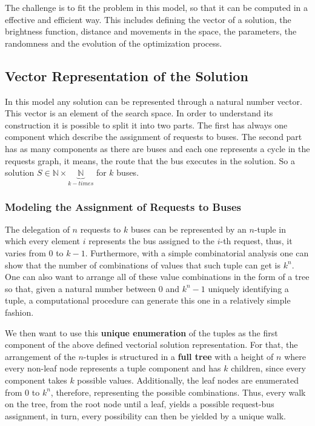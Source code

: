 \documentclass[tuberlin,cic,tc,openright,english,noabntcite,oneside]{iiufrgs}
\begin{document}
The challenge is to fit the problem in this model, so that it can be computed in a effective and efficient way. This includes defining the vector of a solution, the brightness function, distance and movements in the space, the parameters, the randomness and the evolution of the optimization process.

\subsection{Vector Representation of the Solution}
In this model any solution can be represented through a natural number vector. This vector is an element of the search space. In order to understand its construction it is possible to split it into two parts. The first has always one component which describe the assignment of requests to buses. The second part has as many components as there are buses and each one represents a cycle in the requests graph, it means, the route that the bus executes in the solution. So a solution $S \in \mathbb{N} \times \underbrace{\mathbb{N}}_{k-times}$ for $k$ buses.

\subsubsection{Modeling the Assignment of Requests to Buses}\label{sec:model-request-bus}
The delegation of $n$ requests to $k$ buses can be represented by an $n$-tuple in which every element $i$ represents the bus assigned to the $i$-th request, thus, it varies from $0$ to $k-1$. Furthermore, with a simple combinatorial analysis one can show that the number of combinations of values that such tuple can get is $k^n$. One can also want to arrange all of these value combinations in the form of a tree so that, given a natural number between $0$ and $k^n-1$ uniquely identifying a tuple, a computational procedure can generate this one in a relatively simple fashion.

We then want to use this \textbf{unique enumeration} of the tuples as the first component of the above defined vectorial solution representation. For that, the arrangement of the $n$-tuples is structured in a \textbf{full tree} with a height of $n$ where every non-leaf node represents a tuple component and has $k$ children, since every component takes $k$ possible values. Additionally, the leaf nodes are enumerated from $0$ to $k^{n}$, therefore, representing the possible combinations. Thus, every walk on the tree, from the root node until a leaf, yields a possible request-bus assignment, in turn, every possibility can then be yielded by a unique walk.
\end{document}
